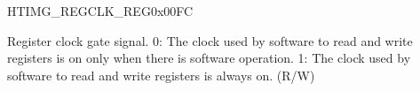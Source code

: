 \begin{register}{H}{TIMG\_REGCLK\_REG}{0x{}00FC}\label{regdesc:TIMGREGCLKREG}
%
%
\regnewline%
\begin{regdesc}\begin{reglist}
\label{fielddesc:TIMGCLKEN}\item [TIMG\_CLK\_EN] Register clock gate signal. 0: The clock used by software to read and write registers is on only when there is software operation. 1: The clock used by software to read and write registers is always on. (R/W)
\end{reglist}\end{regdesc}
\end{register}


